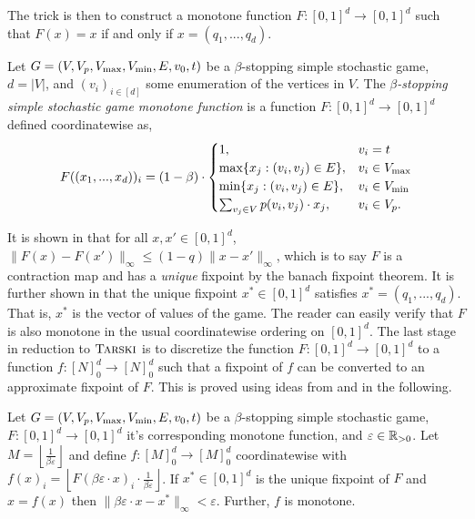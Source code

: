 The trick is then to construct a monotone function $F : [0, 1]^d \to [0, 1]^d$
such that $F(x) = x$ if and only if $x = (q_1, ..., q_d)$.
\begin{definition}
  Let $G = (V, V_p, V_{\max}, V_{\min}, E, v_0, t)$ be a $\beta$-stopping simple stochastic game, 
  $d = |V|$, and $(v_i)_{i \in [d]}$ some enumeration of the vertices in $V$. 
  The \emph{$\beta$-stopping simple stochastic game monotone function} is a function
  $F : [0, 1]^d \to [0, 1]^d$ defined coordinatewise as,
  \begin{align*}
    F((x_1, ..., x_d))_i = 
      \left( 1 - \beta \right) \cdot
      \begin{cases}
        1, & v_i = t \\
        \max\{x_j : (v_i, v_j) \in E\}, & v_i \in V_{\max} \\
        \min\{x_j : (v_i, v_j) \in E\}, & v_i \in V_{\min} \\
        \sum_{v_j \in V} p(v_i, v_j) \cdot x_j, & v_i \in V_p.
      \end{cases}
  \end{align*}
\end{definition}
It is shown in \citep{condon} that for all $x, x' \in [0, 1]^d$, $\|F(x) - F(x')\|_\infty \leq (1 - q)\| x - x'\|_\infty$,
which is to say $F$ is a contraction map and has a \emph{unique} fixpoint by the banach fixpoint theorem.
It is further shown in \citep{condon} that the unique fixpoint $x^* \in [0, 1]^d$ satisfies
$x^* = (q_1, ..., q_d)$. That is, $x^*$ is the vector of values of the game.
The reader can easily verify that $F$ is also monotone in the usual coordinatewise
ordering on $[0, 1]^d$. 
The last stage in reduction to $\textsc{Tarski}$
is to discretize the function $F : [0, 1]^d \to [0, 1]^d$ to a function $f : [N]_0^d \to [N]_0^d$
such that a fixpoint of $f$ can be converted to an approximate fixpoint of $F$.
This is proved using ideas from \citep{nashComp} and \citep{lowerBound} in the following.
\begin{lemma}
 Let $G = (V, V_p, V_{\max}, V_{\min}, E, v_0, t)$ be a $\beta$-stopping simple 
  stochastic game,
  $F : [0, 1]^d \to [0, 1]^d$ it's corresponding monotone function, and 
  $\varepsilon \in \mathbb{R}_{> 0}$.
  Let $M = \left \lfloor \frac{1}{\beta \varepsilon}\right \rfloor$
  and define 
  $f : [M]_0^d \to [M]_0^d$ coordinatewise with 
  $f(x)_i = \left \lfloor F(\beta \varepsilon \cdot x)_i \cdot 
    \frac{1}{\beta \varepsilon}\right \rfloor$.
    If $x^* \in [0, 1]^d$ is the unique fixpoint of $F$
    and $x = f(x)$ then $\|\beta \varepsilon \cdot x - x^*\|_\infty < \varepsilon$.
    Further, $f$ is monotone.
\end{lemma}
